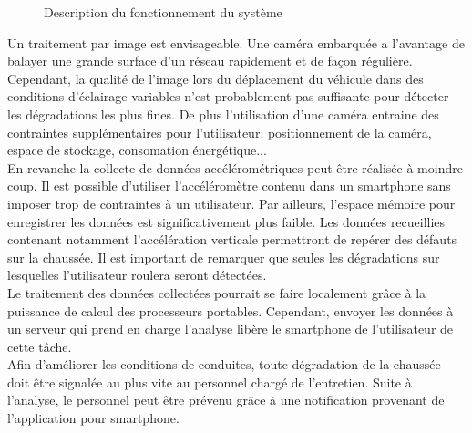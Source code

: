 \begin{figure}[H]
    \centering
    \caption{Description du fonctionnement du système}
    \label{analyse}
\end{figure}

Un traitement par image est envisageable. Une caméra embarquée a
l'avantage de balayer une grande surface d'un réseau rapidement et de façon
régulière. Cependant, la qualité de l'image lors du déplacement du véhicule
dans des conditions d'éclairage variables n'est probablement pas suffisante
pour détecter les dégradations les plus fines. De plus l'utilisation d'une
caméra entraine des contraintes supplémentaires pour l'utilisateur:
positionnement de la caméra, espace de
stockage, consomation énergétique...\\

En revanche la collecte de données accélérométriques peut être réalisée à
moindre coup. Il est possible d'utiliser l'accéléromètre contenu dans un smartphone sans imposer trop de
contraintes à un utilisateur. Par ailleurs, l'espace mémoire pour enregistrer
les données est significativement plus faible. Les données recueillies
contenant notamment l'accélération verticale permettront de repérer des défauts
sur la chaussée. Il est important de remarquer que seules les dégradations sur
lesquelles l'utilisateur roulera seront détectées.\\

Le traitement des données collectées pourrait se faire localement grâce à la puissance de calcul des processeurs portables. Cependant, envoyer les données à un serveur qui prend en charge l'analyse libère le smartphone de l'utilisateur de cette tâche.\\

Afin d'améliorer les conditions de conduites, toute dégradation de la chaussée
doit être signalée au plus vite au personnel chargé de l'entretien. Suite à l'analyse, le
personnel peut être prévenu grâce à une notification provenant de l'application pour smartphone.\\

